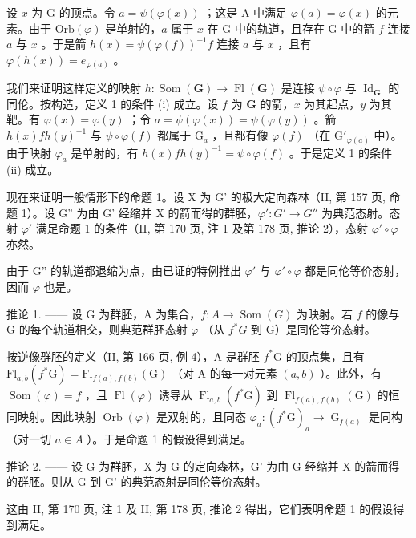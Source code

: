 设 \(x\) 为 G 的顶点。令 \(a = \psi(\varphi(x))\) ；这是 A 中满足 \(\varphi(a) = \varphi(x)\) 的元素。由于 \(\mathrm{Orb}(\varphi)\) 是单射的，\(a\) 属于 \(x\) 在 G 中的轨道，且存在 G 中的箭 \(f\) 连接 \(a\) 与 \(x\) 。于是箭 \(h(x) = \psi(\varphi(f))^{-1}f\) 连接 \(a\) 与 \(x\) ，且有 \(\varphi(h(x)) = e_{\varphi(a)}\) 。

我们来证明这样定义的映射 \(h \colon \operatorname{Som}(\mathbf{G}) \to \operatorname{Fl}(\mathbf{G})\) 是连接 \(\psi \circ \varphi\) 与 \(\operatorname{Id}_{\mathbf{G}}\) 的同伦。按构造，定义 1 的条件 (i) 成立。设 \(f\) 为 \(\mathbf{G}\) 的箭，\(x\) 为其起点，\(y\) 为其靶。有 \(\varphi(x) = \varphi(y)\) ；令 \(a = \psi(\varphi(x)) = \psi(\varphi(y))\) 。箭 \(h(x)fh(y)^{-1}\) 与 \(\psi \circ \varphi(f)\) 都属于 \(\mathrm{G}_a\) ，且都有像 \(\varphi(f)\) （在 \(\mathrm{G}'_{\varphi(a)}\) 中）。由于映射 \(\varphi_a\) 是单射的，有 \(h(x)fh(y)^{-1} = \psi \circ \varphi(f)\) 。于是定义 1 的条件 (ii) 成立。

现在来证明一般情形下的命题 1。设 X 为 G' 的极大定向森林（II, 第 157 页, 命题 1）。设 G'' 为由 G' 经缩并 X 的箭而得的群胚，\(\varphi'\colon G' \to G''\) 为典范态射。态射 \(\varphi'\) 满足命题 1 的条件（II, 第 170 页, 注 1 及第 178 页, 推论 2），态射 \(\varphi'\circ\varphi\) 亦然。

由于 G'' 的轨道都退缩为点，由已证的特例推出 \(\varphi'\) 与 \(\varphi'\circ\varphi\) 都是同伦等价态射，因而 \(\varphi\) 也是。

推论 1. —— 设 G 为群胚，A 为集合，\(f\colon A \to \operatorname{Som}(G)\) 为映射。若 \(f\) 的像与 G 的每个轨道相交，则典范群胚态射 \(\varphi\) （从 \(f^{*}G\) 到 G）是同伦等价态射。

按逆像群胚的定义（II, 第 166 页, 例 4），A 是群胚 \(f^{*}\mathrm{G}\) 的顶点集，且有 \(\mathrm{Fl}_{a,b}(f^{*}\mathrm{G}) = \mathrm{Fl}_{f(a),f(b)}(\mathrm{G})\) （对 A 的每一对元素 \((a,b)\) ）。此外，有 \(\operatorname{Som}(\varphi) = f\) ，且 \(\operatorname{Fl}(\varphi)\) 诱导从 \(\operatorname{Fl}_{a,b}(f^{*}\mathrm{G})\) 到 \(\operatorname{Fl}_{f(a),f(b)}(\mathrm{G})\) 的恒同映射。因此映射 \(\operatorname{Orb}(\varphi)\) 是双射的，且同态 \(\varphi_{a}\colon (f^{*}\mathrm{G})_{a} \to \operatorname{G}_{f(a)}\) 是同构（对一切 \(a \in A\) ）。于是命题 1 的假设得到满足。

推论 2. —— 设 G 为群胚，X 为 G 的定向森林，G' 为由 G 经缩并 X 的箭而得的群胚。则从 G 到 G' 的典范态射是同伦等价态射。

这由 II, 第 170 页, 注 1 及 II, 第 178 页, 推论 2 得出，它们表明命题 1 的假设得到满足。

